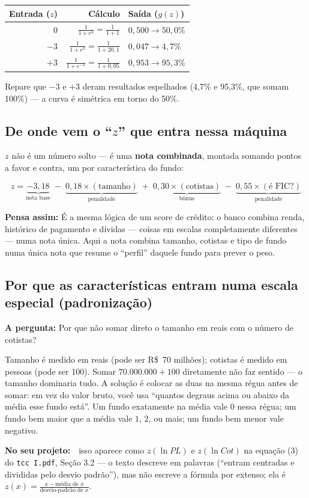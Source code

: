 \documentclass[11pt,a4paper]{article}
\newcommand{\pergunta}[1]{\par\vspace{4pt}\noindent\textbf{\color{azul}A pergunta:} #1\par\vspace{2pt}}
\newcommand{\analogia}[1]{\par\vspace{4pt}\noindent\textbf{\color{verde}Pensa assim:} #1\par\vspace{2pt}}
\newcommand{\noprojeto}[0]{\par\vspace{4pt}\noindent\textbf{No seu projeto:}\ }
\begin{document}
\begin{center}\small
\begin{tabular}{@{}rrl@{}}
\toprule
Entrada ($z$) & Cálculo & Saída ($g(z)$) \\
\midrule
$0$ & $\frac{1}{1+e^{0}}=\frac{1}{1+1}$ & $0{,}500 \to 50{,}0\%$ \\
$-3$ & $\frac{1}{1+e^{3}}=\frac{1}{1+20{,}1}$ & $0{,}047 \to 4{,}7\%$ \\
$+3$ & $\frac{1}{1+e^{-3}}=\frac{1}{1+0{,}05}$ & $0{,}953 \to 95{,}3\%$ \\
\bottomrule
\end{tabular}
\end{center}

Repare que $-3$ e $+3$ deram resultados espelhados (4,7\% e 95,3\%, que somam 100\%) --- a curva
é simétrica em torno do 50\%.

\subsection{De onde vem o ``$z$'' que entra nessa máquina}

$z$ não é um número solto --- é uma \textbf{nota combinada}, montada somando pontos a favor e
contra, um por característica do fundo:

$$z = \underbrace{-3{,}18}_{\text{nota base}} \;-\; \underbrace{0{,}18\times(\text{tamanho})}_{\text{penalidade}} \;+\; \underbrace{0{,}30\times(\text{cotistas})}_{\text{bônus}} \;-\; \underbrace{0{,}55\times(\text{é FIC?})}_{\text{penalidade}}$$

\analogia{É a mesma lógica de um score de crédito: o banco combina renda, histórico de
pagamento e dívidas --- coisas em escalas completamente diferentes --- numa nota única. Aqui a
nota combina tamanho, cotistas e tipo de fundo numa única nota que resume o ``perfil'' daquele
fundo para prever o peso.}

\subsection{Por que as características entram numa escala especial (padronização)}

\pergunta{Por que não somar direto o tamanho em reais com o número de cotistas?}

Tamanho é medido em reais (pode ser R\$~70 milhões); cotistas é medido em pessoas (pode ser
100). Somar $70.000.000 + 100$ diretamente não faz sentido --- o tamanho dominaria tudo. A
solução é colocar as duas na mesma régua antes de somar: em vez do valor bruto, você usa
``quantos degraus acima ou abaixo da média esse fundo está''. Um fundo exatamente na média vale
$0$ nessa régua; um fundo bem maior que a média vale $1$, $2$, ou mais; um fundo bem menor vale
negativo. \noprojeto\ isso aparece como $z(\ln PL)$ e $z(\ln Cot)$ na equação (3) do
\texttt{tcc I.pdf}, Seção 3.2 --- o texto descreve em palavras (``entram centradas e divididas
pelo desvio padrão''), mas não escreve a fórmula por extenso; ela é
$z(x) = \frac{x - \text{média de }x}{\text{desvio-padrão de }x}$.
\end{document}
